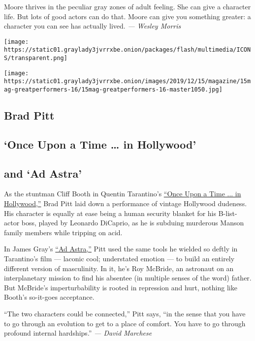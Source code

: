 Moore thrives in the peculiar gray zones of adult feeling. She can give
a character life. But lots of good actors can do that. Moore can give
you something greater: a character you can see has actually lived.
\emph{--- Wesley Morris}

\texttt{[image: https://static01.graylady3jvrrxbe.onion/packages/flash/multimedia/ICONS/transparent.png]}

\texttt{[image: https://static01.graylady3jvrrxbe.onion/images/2019/12/15/magazine/15mag-greatperformers-16/15mag-greatperformers-16-master1050.jpg]}

\hypertarget{brad-pitt}{%
\subsection{Brad Pitt}\label{brad-pitt}}

\hypertarget{once-upon-a-time--in-hollywood}{%
\subsection{`Once Upon a Time \ldots{} in
Hollywood'}\label{once-upon-a-time--in-hollywood}}

\hypertarget{and-ad-astra}{%
\subsection{and `Ad Astra'}\label{and-ad-astra}}

As the stuntman Cliff Booth in Quentin Tarantino's
\href{https://www.nytimes3xbfgragh.onion/2019/07/24/movies/once-upon-a-time-in-hollywood-review.html}{``Once
Upon a Time ... in Hollywood,''} Brad Pitt laid down a performance of
vintage Hollywood dudeness. His character is equally at ease being a
human security blanket for his B-list-actor boss, played by Leonardo
DiCaprio, as he is subduing murderous Manson family members while
tripping on acid.

In James Gray's
\href{https://www.nytimes3xbfgragh.onion/2019/09/19/movies/ad-astra-review-brad-pitt.html}{``Ad
Astra,''} Pitt used the same tools he wielded so deftly in Tarantino's
film --- laconic cool; understated emotion --- to build an entirely
different version of masculinity. In it, he's Roy McBride, an astronaut
on an interplanetary mission to find his absentee (in multiple senses of
the word) father. But McBride's imperturbability is rooted in repression
and hurt, nothing like Booth's so-it-goes acceptance.

``The two characters could be connected,'' Pitt says, ``in the sense
that you have to go through an evolution to get to a place of comfort.
You have to go through profound internal hardships.'' \emph{--- David
Marchese}

